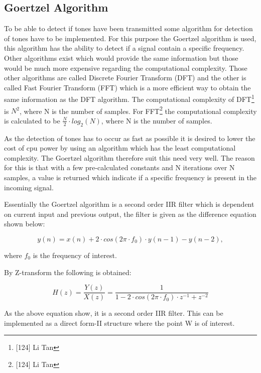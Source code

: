 	\subsection{Goertzel Algorithm}
	To be able to detect if tones have been transmitted some algorithm for detection of tones have to be implemented.
	For this purpose the Goertzel algorithm is used, this algorithm has the ability to detect if a signal contain a
	specific frequency. Other algorithms exist which would provide the same information but those would be
	much more expensive regarding the computational complexity. Those other algorithms are called Discrete Fourier Transform (DFT)
	and the other is called Fast Fourier Transform (FFT) which is a more efficient way to obtain the same information
	as the DFT algorithm. The computational complexity of DFT\footnote{[124] Li Tan} is $N^2$, where N is the number of samples.
	For FFT\footnote{[124] Li Tan} the computational complexity is calculated to be $\frac{N}{2}\cdot log_{2}(N)$,
	where N is the number of samples.
	
	As the detection of tones has to occur as fast as possible it is desired to lower the cost of cpu power by using 
	an algorithm which has the least computational complexity. The Goertzel algorithm therefore suit this need very well.
	The reason for this is that with a few pre-calculated constants and N iterations over N samples, a value is returned
	which indicate if a specific frequency is present in the incoming signal.
	
	Essentially the Goertzel algorithm is a second order IIR filter which is dependent on current input and previous
	output, the filter is given as the difference equation shown below:
	\begin{center}\begin{equation}y(n) = x(n) + 2\cdot cos(2\pi \cdot f_{0})\cdot y(n - 1) - y(n - 2),\end{equation}\end{center}
	where $f_{0}$ is the frequency of interest.
	
	By Z-transform the following is obtained:
	\begin{center}\begin{equation}H(z) = \frac{Y(z)}{X(z)} = \frac{1}{1 - 2\cdot cos(2\pi \cdot f_{0})\cdot z^{-1} + z^{-2}}\end{equation}\end{center}
	
	As the above equation show, it is a second order IIR filter. This can be implemented as a direct form-II structure
	where the point W is of interest.
	
